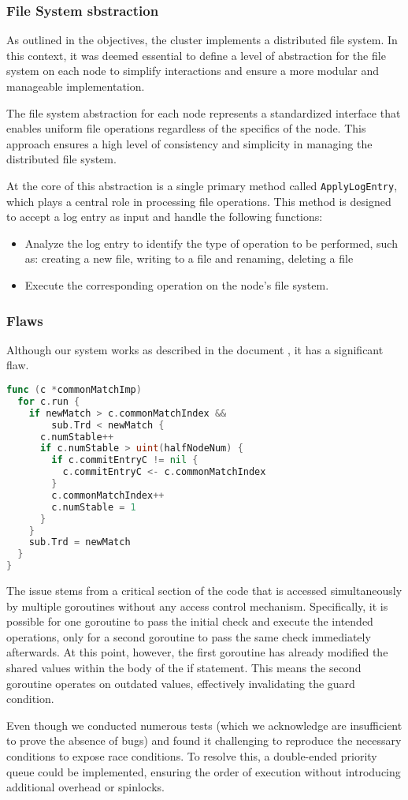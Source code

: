 \subsubsection{File System sbstraction}
As outlined in the objectives, the cluster implements a distributed file system.
In this context, it was deemed essential to define a level of abstraction for the 
file system on each node to simplify interactions and ensure a more modular and 
manageable implementation.

The file system abstraction for each node represents a standardized interface that 
enables uniform file operations regardless of the specifics of the node. This approach 
ensures a high level of consistency and simplicity in managing the distributed file system.

At the core of this abstraction is a single primary method called \texttt{ApplyLogEntry}, which 
plays a central role in processing file operations. This method is designed to accept 
a log entry as input and handle the following functions:
\begin{itemize}
  \item Analyze the log entry to identify the type of operation to be performed, such as: 
    creating a new file, writing to a file and renaming, deleting a file
  \item Execute the corresponding operation on the node's file system.
\end{itemize}


\subsubsection{Flaws}
Although our system works as described in the document \cite{1}, it has a significant flaw.
\begin{lstlisting}[language=Go]
func (c *commonMatchImp) 
  for c.run { 
    if newMatch > c.commonMatchIndex && 
        sub.Trd < newMatch { 
      c.numStable++ 
      if c.numStable > uint(halfNodeNum) {
        if c.commitEntryC != nil {
          c.commitEntryC <- c.commonMatchIndex
        } 
        c.commonMatchIndex++
        c.numStable = 1
      } 
    } 
    sub.Trd = newMatch
  } 
}
\end{lstlisting}
The issue stems from a critical section of the code that is accessed simultaneously
by multiple goroutines without any access control mechanism. Specifically, it is 
possible for one goroutine to pass the initial check and execute the intended operations, 
only for a second goroutine to pass the same check immediately afterwards. At this point, 
however, the first goroutine has already modified the shared values within the body 
of the if statement. This means the second goroutine operates on outdated values, 
effectively invalidating the guard condition.

Even though we conducted numerous tests (which we acknowledge are insufficient to 
prove the absence of bugs) and found it challenging to reproduce the necessary 
conditions to expose race conditions.
To resolve this, a double-ended priority queue could be implemented, ensuring 
the order of execution without introducing additional overhead or spinlocks.

